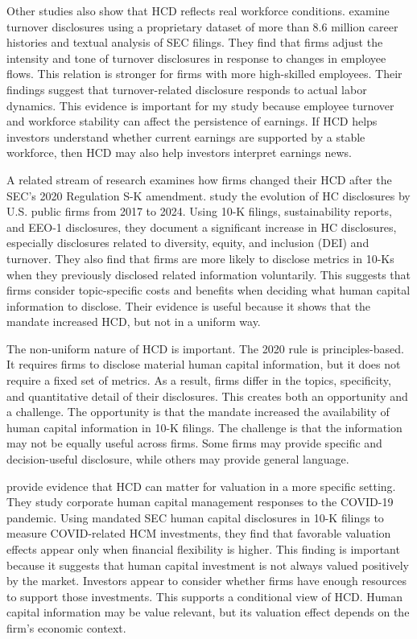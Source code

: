 \documentclass[12pt]{article}
\begin{document}
Other studies also show that HCD reflects real workforce conditions. \citet{dey_al2025} examine turnover disclosures using a proprietary dataset of more than 8.6 million career histories and textual analysis of SEC filings. They find that firms adjust the intensity and tone of turnover disclosures in response to changes in employee flows. This relation is stronger for firms with more high-skilled employees. Their findings suggest that turnover-related disclosure responds to actual labor dynamics. This evidence is important for my study because employee turnover and workforce stability can affect the persistence of earnings. If HCD helps investors understand whether current earnings are supported by a stable workforce, then HCD may also help investors interpret earnings news.

A related stream of research examines how firms changed their HCD after the SEC's 2020 Regulation S-K amendment. \citet{bourveau_al2022} study the evolution of HC disclosures by U.S. public firms from 2017 to 2024. Using 10-K filings, sustainability reports, and EEO-1 disclosures, they document a significant increase in HC disclosures, especially disclosures related to diversity, equity, and inclusion (DEI) and turnover. They also find that firms are more likely to disclose metrics in 10-Ks when they previously disclosed related information voluntarily. This suggests that firms consider topic-specific costs and benefits when deciding what human capital information to disclose. Their evidence is useful because it shows that the mandate increased HCD, but not in a uniform way.

The non-uniform nature of HCD is important. The 2020 rule is principles-based. It requires firms to disclose material human capital information, but it does not require a fixed set of metrics. As a result, firms differ in the topics, specificity, and quantitative detail of their disclosures. This creates both an opportunity and a challenge. The opportunity is that the mandate increased the availability of human capital information in 10-K filings. The challenge is that the information may not be equally useful across firms. Some firms may provide specific and decision-useful disclosure, while others may provide general language.

\citet{mayewZhang2024} provide evidence that HCD can matter for valuation in a more specific setting. They study corporate human capital management responses to the COVID-19 pandemic. Using mandated SEC human capital disclosures in 10-K filings to measure COVID-related HCM investments, they find that favorable valuation effects appear only when financial flexibility is higher. This finding is important because it suggests that human capital investment is not always valued positively by the market. Investors appear to consider whether firms have enough resources to support those investments. This supports a conditional view of HCD. Human capital information may be value relevant, but its valuation effect depends on the firm's economic context.
\end{document}
